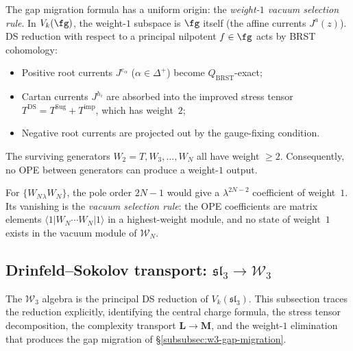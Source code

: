 \begin{remark}%
\label{rem:weight-1-vacuum-selection}%
%
%
The gap migration formula has a uniform origin: the
\emph{weight-$1$ vacuum selection rule}. In $V_k(\fg)$,
the weight-$1$ subspace is $\fg$ itself (the affine
currents $J^a(z)$). DS reduction with respect to a
principal nilpotent $f \in \fg$ acts by BRST cohomology:
\begin{itemize}
\item Positive root currents $J^{e_\alpha}$ ($\alpha \in \Delta^+$)
 become $Q_{\mathrm{BRST}}$-exact;
\item Cartan currents $J^{h_i}$ are absorbed into the
 improved stress tensor $T^{\mathrm{DS}} = T^{\mathrm{Sug}}
 + T^{\mathrm{imp}}$, which has weight~$2$;
\item Negative root currents are projected out by the
 gauge-fixing condition.
\end{itemize}
The surviving generators $W_2 = T, W_3, \ldots, W_N$
all have weight $\ge 2$. Consequently, no OPE between
generators can produce a weight-$1$ output.

For $\{W_N{}_\lambda W_N\}$, the pole order $2N - 1$ would
give a $\lambda^{2N-2}$ coefficient of weight~$1$. Its
vanishing is the \emph{vacuum selection rule}: the OPE
coefficients are matrix elements $\langle 1 | W_N \cdots
W_N | 1 \rangle$ in a highest-weight module, and no
state of weight~$1$ exists in the vacuum module of
$\mathcal{W}_N$.
\end{remark}


\subsection{Drinfeld--Sokolov transport:
\texorpdfstring{$\mathfrak{sl}_3 \to \mathcal{W}_3$}{sl\_3 to W\_3}}
\label{subsec:ds-transport-sl3-w3}

The $\mathcal{W}_3$ algebra is the principal DS reduction
of $V_k(\mathfrak{sl}_3)$. This subsection traces the
reduction explicitly, identifying the central charge formula,
the stress tensor decomposition, the complexity transport
$\mathbf{L} \to \mathbf{M}$, and the weight-$1$ elimination
that produces the gap migration of
\S\ref{subsubsec:w3-gap-migration}.

